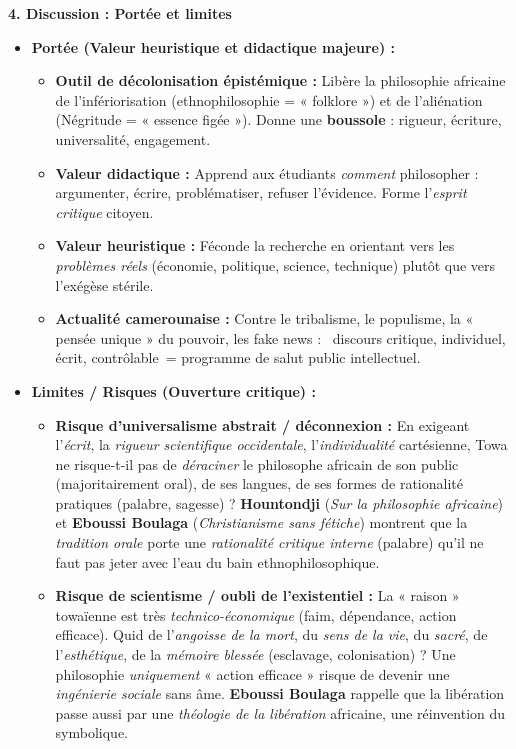 \documentclass[11pt]{article}
\newcommand{\cle}[1]{{\popxbold\color{popdark}#1}}
\begin{document}
\begin{corrige}
\textbf{4. Discussion : Portée et limites}
\begin{itemize}
\item \textbf{Portée (Valeur heuristique et didactique majeure) :}
\begin{itemize}
\item \textbf{Outil de décolonisation épistémique :} Libère la philosophie africaine de l'infériorisation (ethnophilosophie = « folklore ») et de l'aliénation (Négritude = « essence figée »). Donne une \textbf{boussole} : rigueur, écriture, universalité, engagement.
\item \textbf{Valeur didactique :} Apprend aux étudiants \emph{comment} philosopher : argumenter, écrire, problématiser, refuser l'évidence. Forme l'\emph{esprit critique} citoyen.
\item \textbf{Valeur heuristique :} Féconde la recherche en orientant vers les \emph{problèmes réels} (économie, politique, science, technique) plutôt que vers l'exégèse stérile.
\item \textbf{Actualité camerounaise :} Contre le tribalisme, le populisme, la « pensée unique » du pouvoir, les fake news : \guillemotleft~discours critique, individuel, écrit, contrôlable~\guillemotright = programme de salut public intellectuel.
\end{itemize}
\item \textbf{Limites / Risques (Ouverture critique) :}
\begin{itemize}
\item \textbf{Risque d'\cle{universalisme abstrait} / déconnexion :} En exigeant l'\emph{écrit}, la \emph{rigueur scientifique occidentale}, l'\emph{individualité} cartésienne, Towa ne risque-t-il pas de \emph{déraciner} le philosophe africain de son public (majoritairement oral), de ses langues, de ses formes de rationalité pratiques (palabre, sagesse) ? \textbf{Hountondji} (\emph{Sur la philosophie africaine}) et \textbf{Eboussi Boulaga} (\emph{Christianisme sans fétiche}) montrent que la \emph{tradition orale} porte une \emph{rationalité critique interne} (palabre) qu'il ne faut pas jeter avec l'eau du bain ethnophilosophique.
\item \textbf{Risque de \cle{scientisme} / oubli de l'existentiel :} La « raison » towaïenne est très \emph{technico-économique} (faim, dépendance, action efficace). Quid de l'\emph{angoisse de la mort}, du \emph{sens de la vie}, du \emph{sacré}, de l'\emph{esthétique}, de la \emph{mémoire blessée} (esclavage, colonisation) ? Une philosophie \emph{uniquement} « action efficace » risque de devenir une \emph{ingénierie sociale} sans âme. \textbf{Eboussi Boulaga} rappelle que la libération passe aussi par une \emph{théologie de la libération} africaine, une réinvention du symbolique.

\end{itemize}
\end{itemize}
\end{corrige}
\end{document}

